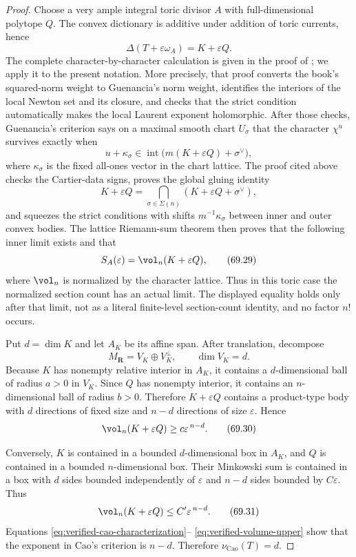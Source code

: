 \begin{proof}
Choose a very ample integral toric divisor \(A\) with full-dimensional
polytope \(Q\). The convex dictionary is additive under addition of
toric currents, hence
\[
               \Delta(T+\varepsilon\omega_A)
                         =K+\varepsilon Q.
\tag{69.28}\label{eq:verified-minkowski-perturbation}
\]
The complete character-by-character calculation is given in the proof of
; we apply it to the present notation.  More
precisely, that proof converts the book's squared-norm weight to
Guenancia's norm weight, identifies the interiors of the local Newton set
and its closure, and checks that the strict condition automatically makes
the local Laurent exponent holomorphic.  After those checks, Guenancia's
criterion \cite[Theorem~1.13]{Guenancia12} says on a maximal smooth chart
\(U_\sigma\) that the character \(\chi^u\) survives exactly when
\[
 u+\kappa_\sigma\in
 \operatorname{int}\bigl(m(K+\varepsilon Q)+\sigma^\vee\bigr),
\]
where \(\kappa_\sigma\) is the fixed all-ones vector in the chart lattice.
The proof cited above checks the Cartier-data signs, proves the global gluing
identity
\[
 K+\varepsilon Q
 =\bigcap_{\sigma\in\Sigma(n)}
   (K+\varepsilon Q+\sigma^\vee),
\]
and squeezes the strict conditions with shifts \(m^{-1}\kappa_\sigma\) between
inner and outer convex bodies.  The lattice Riemann-sum theorem then proves
that the following inner limit exists and that
\[
                         S_A(\varepsilon)
                         =\vol_n(K+\varepsilon Q),
\tag{69.29}\label{eq:verified-toric-rr}
\]
where \(\vol_n\) is normalized by the character lattice.  Thus in this toric
case the normalized section count has an actual limit.  The displayed equality
holds only after that limit, not as a literal finite-level section-count
identity, and no factor \(n!\) occurs.

Put \(d=\dim K\) and let \(A_K\) be its affine span. After translation,
decompose
\[
                  M_{\mathbf R}=V_K\oplus V_K^\perp,
       \qquad \dim V_K=d.
\]
Because \(K\) has nonempty relative interior in \(A_K\), it contains a
\(d\)-dimensional ball of radius \(a>0\) in \(V_K\). Since \(Q\) has
nonempty interior, it contains an \(n\)-dimensional ball of radius
\(b>0\). Therefore \(K+\varepsilon Q\) contains a product-type body
with \(d\) directions of fixed size and \(n-d\) directions of size
\(\varepsilon\). Hence
\[
                \vol_n(K+\varepsilon Q)
                       \geq c\varepsilon^{\,n-d}.
\tag{69.30}\label{eq:verified-volume-lower}
\]

Conversely, \(K\) is contained in a bounded \(d\)-dimensional box in
\(A_K\), and \(Q\) is contained in a bounded \(n\)-dimensional box.
Their Minkowski sum is contained in a box with \(d\) sides bounded
independently of \(\varepsilon\) and \(n-d\) sides bounded by
\(C\varepsilon\). Thus
\[
                \vol_n(K+\varepsilon Q)
                       \leq C'\varepsilon^{\,n-d}.
\tag{69.31}\label{eq:verified-volume-upper}
\]
Equations \eqref{eq:verified-cao-characterization}--
\eqref{eq:verified-volume-upper} show that the exponent in Cao's
criterion is \(n-d\). Therefore
\(\nu_{\mathrm{Cao}}(T)=d\).
\end{proof}
